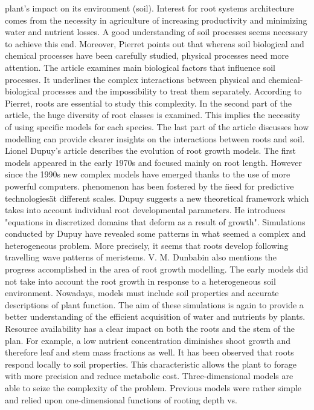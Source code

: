plant’s impact on its environment (soil). Interest for root systems architecture comes
from the necessity in agriculture of increasing productivity and minimizing water and
nutrient losses. A good understanding of soil processes seems necessary to achieve this
end. Moreover, Pierret points out that whereas soil biological and chemical processes
have been carefully studied, physical processes need more attention. The article examines
main biological factors that influence soil processes. It underlines the complex interactions
between physical and chemical-biological processes and the impossibility to treat them
separately. According to Pierret, roots are essential to study this complexity. In the
second part of the article, the huge diversity of root classes is examined. This implies the
necessity of using specific models for each species. The last part of the article discusses
how modelling can provide clearer insights on the interactions between roots and soil.
Lionel Dupuy’s article describes the evolution of root growth models. The first models
appeared in the early 1970s and focused mainly on root length. However since the 1990s
new complex models have emerged thanks to the use of more powerful computers.
phenomenon has been fostered by the \"need for predictive technologies\" at different scales.
Dupuy suggests a new theoretical framework which takes into account individual root
developmental parameters. He introduces "equations in discretized domains that deform
as a result of growth". Simulations conducted by Dupuy have revealed some patterns in
what seemed a complex and heterogeneous problem. More precisely, it seems that roots
develop following travelling wave patterns of meristems.
V. M. Dunbabin also mentions the progress accomplished in the area of root growth
modelling. The early models did not take into account the root growth in response to
a heterogeneous soil environment. Nowadays, models must include soil properties and
accurate descriptions of plant function. The aim of these simulations is again to provide a better understanding of the efficient acquisition of water and nutrients by plants. Resource
availability has a clear impact on both the roots and the stem of the plan. For example,
a low nutrient concentration diminishes shoot growth and therefore leaf and stem mass
fractions as well. It has been observed that roots respond locally to soil properties. This
characteristic allows the plant to forage with more precision and reduce metabolic cost.
Three-dimensional models are able to seize the complexity of the problem. Previous
models were rather simple and relied upon one-dimensional functions of rooting depth vs.
